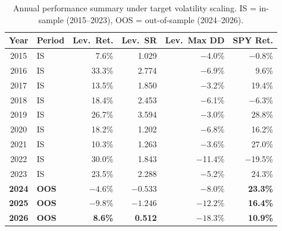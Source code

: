 \begin{table}[htbp]
    \centering
    \small
    \begin{tabular}{clrrrr}
        \toprule
        Year & Period & Lev.\ Ret. & Lev.\ SR & Lev.\ Max DD & SPY Ret. \\
        \midrule
        2015 & IS &     7.6\% &    1.029 &  $-$4.0\% &  $-$0.8\% \\
        2016 & IS &    33.3\% &    2.774 &  $-$6.9\% &   9.6\% \\
        2017 & IS &    13.5\% &    1.850 &  $-$3.2\% &  19.4\% \\
        2018 & IS &    18.4\% &    2.453 &  $-$6.1\% &  $-$6.3\% \\
        2019 & IS &    26.7\% &    3.594 &  $-$3.0\% &  28.8\% \\
        2020 & IS &    18.2\% &    1.202 &  $-$6.8\% &  16.2\% \\
        2021 & IS &    10.3\% &    1.263 &  $-$3.6\% &  27.0\% \\
        2022 & IS &    30.0\% &    1.843 & $-$11.4\% & $-$19.5\% \\
        2023 & IS &    23.5\% &    2.288 &  $-$5.2\% &  24.3\% \\
        \midrule
        \textbf{2024} & \textbf{OOS} & $\mathbf{-4.6\%}$  & $\mathbf{-0.533}$ & $\mathbf{-8.0\%}$  & \textbf{23.3\%} \\
        \textbf{2025} & \textbf{OOS} & $\mathbf{-9.8\%}$  & $\mathbf{-1.246}$ & $\mathbf{-12.2\%}$ & \textbf{16.4\%} \\
        \textbf{2026} & \textbf{OOS} & \textbf{8.6\%}     & \textbf{0.512}    & $\mathbf{-18.3\%}$ & \textbf{10.9\%} \\
        \bottomrule
    \end{tabular}
    \caption{Annual performance summary under target volatility scaling. IS = in-sample (2015--2023), OOS = out-of-sample (2024--2026).}
    \label{tab:annual-performance}
\end{table}
